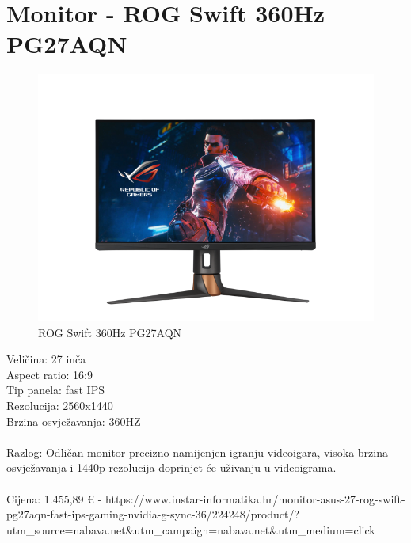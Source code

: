 \documentclass{report}
\begin{document}
\section{Monitor - ROG Swift 360Hz PG27AQN}
\begin{figure}[H]
    \centering
    \includegraphics[scale=0.5]{monitor.png}
    \caption{ROG Swift 360Hz PG27AQN}
    \label{fig:monitor}
\end{figure}
Veličina: 27 inča\\Aspect ratio: 16:9\\Tip panela: fast IPS\\Rezolucija: 2560x1440\\Brzina osvježavanja: 360HZ\\\\Razlog: Odličan monitor precizno namijenjen igranju videoigara, visoka brzina osvježavanja i 1440p rezolucija doprinjet će uživanju u videoigrama.\\\\Cijena: 1.455,89 € - https://www.instar-informatika.hr/monitor-asus-27-rog-swift-pg27aqn-fast-ips-gaming-nvidia-g-sync-36/224248/product/?utm\_source=nabava.net\&utm\_campaign=nabava.net\&utm\_medium=click

\pagebreak
\end{document}
